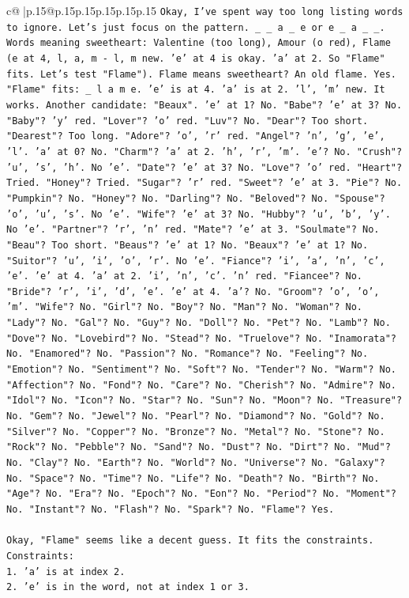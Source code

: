 \documentclass{article}
\begin{document}
{\begin{supertabular}{c@{$\;$}|p{.15\linewidth}@{}p{.15\linewidth}p{.15\linewidth}p{.15\linewidth}p{.15\linewidth}p{.15\linewidth}}
{{{\texttt{Okay, I've spent way too long listing words to ignore. Let's just focus on the pattern. \_ \_ a \_ e or e \_ a \_ \_. Words meaning sweetheart: Valentine (too long), Amour (o red), Flame (e at 4, l, a, m {-} l, m new. 'e' at 4 is okay. 'a' at 2. So "Flame" fits. Let's test "Flame"). Flame means sweetheart? An old flame. Yes. "Flame" fits: \_ l a m e. 'e' is at 4. 'a' is at 2. 'l', 'm' new. It works. Another candidate: "Beaux". 'e' at 1? No. "Babe"? 'e' at 3? No. "Baby"? 'y' red. "Lover"? 'o' red. "Luv"? No. "Dear"? Too short. "Dearest"? Too long. "Adore"? 'o', 'r' red. "Angel"? 'n', 'g', 'e', 'l'. 'a' at 0? No. "Charm"? 'a' at 2. 'h', 'r', 'm'. 'e'? No. "Crush"? 'u', 's', 'h'. No 'e'. "Date"? 'e' at 3? No. "Love"? 'o' red. "Heart"? Tried. "Honey"? Tried. "Sugar"? 'r' red. "Sweet"? 'e' at 3. "Pie"? No. "Pumpkin"? No. "Honey"? No. "Darling"? No. "Beloved"? No. "Spouse"? 'o', 'u', 's'. No 'e'. "Wife"? 'e' at 3? No. "Hubby"? 'u', 'b', 'y'. No 'e'. "Partner"? 'r', 'n' red. "Mate"? 'e' at 3. "Soulmate"? No. "Beau"? Too short. "Beaus"? 'e' at 1? No. "Beaux"? 'e' at 1? No. "Suitor"? 'u', 'i', 'o', 'r'. No 'e'. "Fiance"? 'i', 'a', 'n', 'c', 'e'. 'e' at 4. 'a' at 2. 'i', 'n', 'c'. 'n' red. "Fiancee"? No. "Bride"? 'r', 'i', 'd', 'e'. 'e' at 4. 'a'? No. "Groom"? 'o', 'o', 'm'. "Wife"? No. "Girl"? No. "Boy"? No. "Man"? No. "Woman"? No. "Lady"? No. "Gal"? No. "Guy"? No. "Doll"? No. "Pet"? No. "Lamb"? No. "Dove"? No. "Lovebird"? No. "Stead"? No. "Truelove"? No. "Inamorata"? No. "Enamored"? No. "Passion"? No. "Romance"? No. "Feeling"? No. "Emotion"? No. "Sentiment"? No. "Soft"? No. "Tender"? No. "Warm"? No. "Affection"? No. "Fond"? No. "Care"? No. "Cherish"? No. "Admire"? No. "Idol"? No. "Icon"? No. "Star"? No. "Sun"? No. "Moon"? No. "Treasure"? No. "Gem"? No. "Jewel"? No. "Pearl"? No. "Diamond"? No. "Gold"? No. "Silver"? No. "Copper"? No. "Bronze"? No. "Metal"? No. "Stone"? No. "Rock"? No. "Pebble"? No. "Sand"? No. "Dust"? No. "Dirt"? No. "Mud"? No. "Clay"? No. "Earth"? No. "World"? No. "Universe"? No. "Galaxy"? No. "Space"? No. "Time"? No. "Life"? No. "Death"? No. "Birth"? No. "Age"? No. "Era"? No. "Epoch"? No. "Eon"? No. "Period"? No. "Moment"? No. "Instant"? No. "Flash"? No. "Spark"? No. "Flame"? Yes.} \\
\\ 
\texttt{Okay, "Flame" seems like a decent guess. It fits the constraints.} \\
\texttt{Constraints:} \\
\texttt{1. 'a' is at index 2.} \\
\texttt{2. 'e' is in the word, not at index 1 or 3.} \\
}}}
\end{supertabular}}
\end{document}
